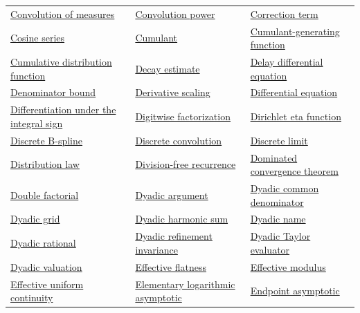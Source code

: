 \documentclass[11pt,oneside]{article}
\begin{document}
\begin{longtable}{p{}p{}p{}}
\hyperlink{gls:convolution-measure}{Convolution of measures} & \hyperlink{gls:convolution-power}{Convolution power} & \hyperlink{gls:correction-term}{Correction term} \\
\hyperlink{gls:cosine-series}{Cosine series} & \hyperlink{gls:cumulant}{Cumulant} & \hyperlink{gls:cumulant-generating-function}{Cumulant-generating function} \\
\hyperlink{gls:cumulative-distribution-function}{Cumulative distribution function} & \hyperlink{gls:decay-estimate}{Decay estimate} & \hyperlink{gls:delay-differential-equation}{Delay differential equation} \\
\hyperlink{gls:denominator-bound}{Denominator bound} & \hyperlink{gls:derivative-scaling}{Derivative scaling} & \hyperlink{gls:differential-equation}{Differential equation} \\
\hyperlink{gls:differentiation-under-the-integral-sign}{Differentiation under the integral sign} & \hyperlink{gls:digitwise-factorization}{Digitwise factorization} & \hyperlink{gls:dirichlet-eta-function}{Dirichlet eta function} \\
\hyperlink{gls:discrete-b-spline}{Discrete B-spline} & \hyperlink{gls:discrete-convolution}{Discrete convolution} & \hyperlink{gls:discrete-limit}{Discrete limit} \\
\hyperlink{gls:distribution-law}{Distribution law} & \hyperlink{gls:division-free-recurrence}{Division-free recurrence} & \hyperlink{gls:dominated-convergence-theorem}{Dominated convergence theorem} \\
\hyperlink{gls:double-factorial}{Double factorial} & \hyperlink{gls:dyadic-argument}{Dyadic argument} & \hyperlink{gls:dyadic-common-denominator}{Dyadic common denominator} \\
\hyperlink{gls:dyadic-grid}{Dyadic grid} & \hyperlink{gls:dyadic-harmonic-sum}{Dyadic harmonic sum} & \hyperlink{gls:dyadic-name}{Dyadic name} \\
\hyperlink{gls:dyadic-rational}{Dyadic rational} & \hyperlink{gls:dyadic-refinement-invariance}{Dyadic refinement invariance} & \hyperlink{gls:dyadic-taylor-evaluator}{Dyadic Taylor evaluator} \\
\hyperlink{gls:dyadic-valuation}{Dyadic valuation} & \hyperlink{gls:effective-flatness}{Effective flatness} & \hyperlink{gls:effective-modulus}{Effective modulus} \\
\hyperlink{gls:effective-uniform-continuity}{Effective uniform continuity} & \hyperlink{gls:elementary-logarithmic-asymptotic}{Elementary logarithmic asymptotic} & \hyperlink{gls:endpoint-asymptotic}{Endpoint asymptotic} \\

\end{longtable}
\end{document}
